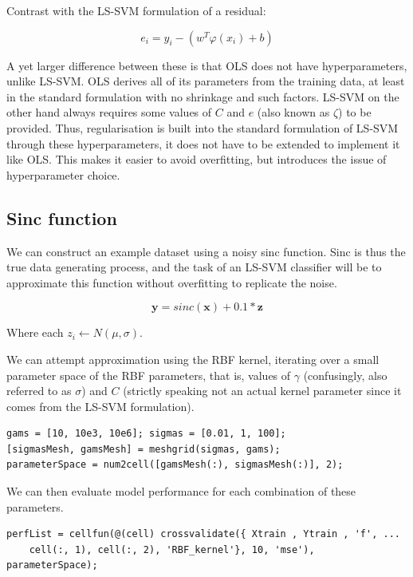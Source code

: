 \documentclass[10pt,a4paper]{article}
\begin{document}
Contrast with the LS-SVM formulation of a residual:

$$
e_i = y_i - (w^T\varphi(x_i) + b)
$$

A yet larger difference between these is that OLS does not have hyperparameters, unlike LS-SVM. OLS derives all of its parameters from the training data, at least in the standard formulation with no shrinkage and such factors. LS-SVM on the other hand always requires some values of $C$ and $e$ (also known as $\zeta$) to be provided. Thus, regularisation is built into the standard formulation of LS-SVM through these hyperparameters, it does not have to be extended to implement it like OLS. This makes it easier to avoid overfitting, but introduces the issue of hyperparameter choice.

\subsection{Sinc function}

We can construct an example dataset using a noisy sinc function. Sinc is thus the true data generating process, and the task of an LS-SVM classifier will be to approximate this function without overfitting to replicate the noise.

$$
\mathbf{y} = sinc(\mathbf{x}) + 0.1 * \mathbf{z}
$$

Where each $z_i \leftarrow N(\mu, \sigma)$.

We can attempt approximation using the RBF kernel, iterating over a small parameter space of the RBF parameters, that is, values of $\gamma$ (confusingly, also referred to as $\sigma$) and $C$ (strictly speaking not an actual kernel parameter since it comes from the LS-SVM formulation).

\begin{lstlisting}[style=Matlab-editor, frame=single]
gams = [10, 10e3, 10e6]; sigmas = [0.01, 1, 100];
[sigmasMesh, gamsMesh] = meshgrid(sigmas, gams);
parameterSpace = num2cell([gamsMesh(:), sigmasMesh(:)], 2);
\end{lstlisting}

We can then evaluate model performance for each combination of these parameters.

\begin{lstlisting}[style=Matlab-editor, frame=single]
perfList = cellfun(@(cell) crossvalidate({ Xtrain , Ytrain , 'f', ...
    cell(:, 1), cell(:, 2), 'RBF_kernel'}, 10, 'mse'), parameterSpace);
\end{lstlisting}
\end{document}

